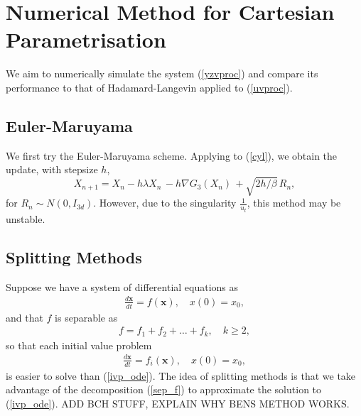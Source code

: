 \documentclass{article}
\renewcommand{\vec}[1]{{\mathbf{#1}}}
\begin{document}
\section{Numerical Method for Cartesian Parametrisation}
We aim to numerically simulate the system (\ref{yzvproc}) and compare its performance to that of Hadamard-Langevin applied to (\ref{uvproc}). 
\subsection{Euler-Maruyama}
We first try the Euler-Maruyama scheme. Applying to (\ref{cyl}), we obtain the update, with stepsize $h$,
\[X_{n+1} = X_n - h\lambda X_n \, - h\nabla G_{3}(X_n)\, + \sqrt{2h/\beta}\,R_n,\]
for $R_n \sim N(0,I_{3d})$. However, due to the singularity $\frac{1}{u_t}$, this method may be unstable.

\subsection{Splitting Methods}
Suppose we have a system of differential equations as
\begin{equation}  
 \begin{aligned}
  \frac{d\vec x}{dt} = f(\vec x), \quad  x(0) = x_0,
  \end{aligned}\label{ivp_ode}
\end{equation}
and that $f$ is separable as 
\begin{equation}  
 \begin{aligned}
  f = f_1 + f_2 + \hdots + f_k, \quad k \geq 2,
  \end{aligned}\label{sep_f}
\end{equation}
so that each initial value problem 
\begin{equation}  
 \begin{aligned}
  \frac{d\vec x}{dt} = f_i(\vec x), \quad  x(0) = x_0,
  \end{aligned}\label{ivp_ode_small}
\end{equation}
is easier to solve than (\ref{ivp_ode}). The idea of splitting methods is that we take advantage of the decomposition (\ref{sep_f}) to approximate the solution to (\ref{ivp_ode}). ADD BCH STUFF, EXPLAIN WHY BENS METHOD WORKS.

\end{document}
